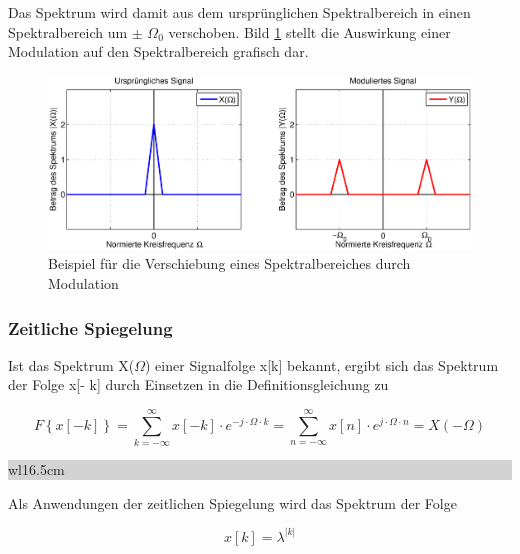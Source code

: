 \noindent Das Spektrum wird damit aus dem urspr\"{u}nglichen Spektralbereich in einen Spektralbereich um $\mathrm{\pm}$ $\Omega_{0}$ verschoben. Bild \ref{fig:FourierModulation} stellt die Auswirkung einer Modulation auf den Spektralbereich grafisch dar.

\begin{figure}[H]
  \centerline{\includegraphics[width=1\textwidth]{Kapitel7/Bilder/image9.eps}}
  \caption{Beispiel f\"{u}r die Verschiebung eines Spektralbereiches durch Modulation}
  \label{fig:FourierModulation}
\end{figure}

\subsubsection{Zeitliche Spiegelung}

\noindent Ist das Spektrum X($\Omega$) einer Signalfolge x[k] bekannt, ergibt sich das Spektrum der Folge x[- k] durch Einsetzen in die Definitionsgleichung zu\bigskip

\begin{equation}\label{eq:sevensixtytwo}
F\left\{x\left[-k\right]\right\}=\sum _{k=-\infty }^{\infty }x\left[-k\right]\cdot e^{-j\cdot \Omega \cdot k}  =\sum _{n=-\infty }^{\infty }x\left[n\right]\cdot e^{j\cdot \Omega \cdot n}  =X\left(-\Omega \right)
\end{equation}

\clearpage

\noindent
\colorbox{lightgray}{%
%
\renewcommand\arraystretch{0.6}%
\begin{tabular}{ wl{16.5cm} }
{\selectfont{Beispiel: Zeitliche Spiegelung}}
\end{tabular}%
}\medskip

\noindent Als Anwendungen der zeitlichen Spiegelung wird das Spektrum der Folge

\begin{equation}\label{eq:sevensixtythree}
x\left[k\right]=\lambda ^{\left|k\right|}
\end{equation}

